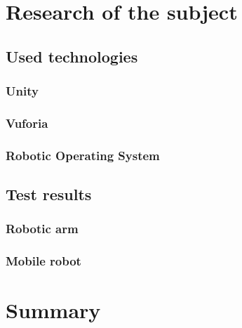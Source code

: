 \documentclass[printmode,en]{mgr}
\begin{document}
\chapter{Research of the subject}

\section{Used technologies}

\subsection{Unity}

\subsection{Vuforia}

\subsection{Robotic Operating System}

\section{Test results}

\subsection{Robotic arm}

\subsection{Mobile robot}


\chapter{Summary}
\appendix




\end{document}
